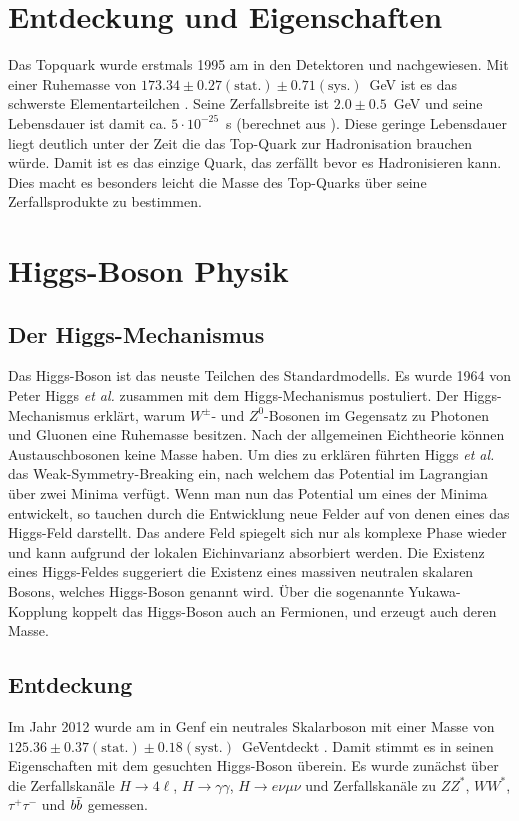 \section{Entdeckung und Eigenschaften}
Das Topquark wurde erstmals 1995 am \tevatron in den Detektoren \dzero und \cdf nachgewiesen\cite{PhysRevLett.74.2626}. Mit einer Ruhemasse von $173.34 \pm 0.27(\text{stat.}) \pm 0.71 (\text{sys.})$~GeV ist es das schwerste Elementarteilchen \cite{ATLAS:2014wva}. Seine Zerfallsbreite ist $2.0\pm0.5$~GeV und seine Lebensdauer ist damit ca. $5\cdot10^{-25}$~s (berechnet aus \cite{2006EPJC...48..835Q}). Diese geringe Lebensdauer liegt deutlich unter der Zeit die das Top-Quark zur Hadronisation brauchen würde. Damit ist es das einzige Quark, das zerfällt bevor es Hadronisieren kann. Dies macht es besonders leicht die Masse des Top-Quarks über seine Zerfallsprodukte zu bestimmen.
 

\section{Higgs-Boson Physik}
\subsection{Der Higgs-Mechanismus}
Das Higgs-Boson ist das neuste Teilchen des Standardmodells. Es wurde 1964 von Peter Higgs \emph{et al.} zusammen mit dem Higgs-Mechanismus postuliert\cite{Higgs:1964pj}. Der Higgs-Mechanismus erklärt, warum $W^\pm$- und $Z^0$-Bosonen im Gegensatz zu Photonen und Gluonen eine Ruhemasse besitzen. Nach der allgemeinen Eichtheorie können Austauschbosonen keine Masse haben. Um dies zu erklären führten Higgs \emph{et al.} das Weak-Symmetry-Breaking ein, nach welchem das Potential im Lagrangian über zwei Minima verfügt. Wenn man nun das Potential um eines der Minima entwickelt, so tauchen durch die Entwicklung neue Felder auf von denen eines das Higgs-Feld darstellt\cite{halzen2008quark}. Das andere Feld spiegelt sich nur als komplexe Phase wieder und kann aufgrund der lokalen Eichinvarianz absorbiert werden. Die Existenz eines Higgs-Feldes suggeriert die Existenz eines massiven neutralen skalaren Bosons, welches Higgs-Boson genannt wird.
Über die sogenannte Yukawa-Kopplung koppelt das Higgs-Boson auch an Fermionen, und erzeugt auch deren Masse.
\subsection{Entdeckung}
Im Jahr 2012 wurde am \lhc in Genf ein neutrales Skalarboson mit einer Masse von $125.36 \pm 0.37(\text{stat.}) \pm 0.18 (\text{syst.})$~GeVentdeckt \cite{Aad:2012tfa}. Damit stimmt es in seinen Eigenschaften mit dem gesuchten Higgs-Boson überein. Es wurde zunächst über die Zerfallskanäle $H \rightarrow 4 \ell$, $H \rightarrow \gamma\gamma$, $H \rightarrow e\nu\mu\nu$ und Zerfallskanäle zu $ZZ^*$, $WW^*$, $\tau^+\tau^-$ und $\mbox{$b\bar{b}$}$ gemessen.

